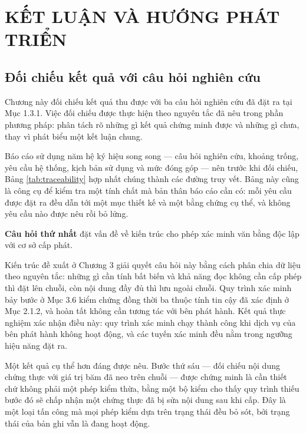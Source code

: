 \chapter{KẾT LUẬN VÀ HƯỚNG PHÁT TRIỂN}

\section{Đối chiếu kết quả với câu hỏi nghiên cứu}

Chương này đối chiếu kết quả thu được với ba câu hỏi nghiên cứu đã đặt ra tại Mục 1.3.1. Việc đối chiếu được thực hiện theo nguyên tắc đã nêu trong phần phương pháp: phân tách rõ những gì kết quả chứng minh được và những gì chưa, thay vì phát biểu một kết luận chung.

Báo cáo sử dụng năm hệ ký hiệu song song --- câu hỏi nghiên cứu, khoảng trống, yêu cầu hệ thống, kịch bản sử dụng và mức đóng góp --- nên trước khi đối chiếu, Bảng \ref{tab:traceability} hợp nhất chúng thành các đường truy vết. Bảng này cũng là công cụ để kiểm tra một tính chất mà bản thân báo cáo cần có: mỗi yêu cầu được đặt ra đều dẫn tới một mục thiết kế và một bằng chứng cụ thể, và không yêu cầu nào được nêu rồi bỏ lửng.




\noindent \textbf{Câu hỏi thứ nhất} đặt vấn đề về kiến trúc cho phép xác minh văn bằng độc lập với cơ sở cấp phát.

Kiến trúc đề xuất ở Chương 3 giải quyết câu hỏi này bằng cách phân chia dữ liệu theo nguyên tắc: những gì cần tính bất biến và khả năng đọc không cần cấp phép thì đặt lên chuỗi, còn nội dung đầy đủ thì lưu ngoài chuỗi. Quy trình xác minh bảy bước ở Mục 3.6 kiểm chứng đồng thời ba thuộc tính tin cậy đã xác định ở Mục 2.1.2, và hoàn tất không cần tương tác với bên phát hành. Kết quả thực nghiệm xác nhận điều này: quy trình xác minh chạy thành công khi dịch vụ của bên phát hành không hoạt động, và các tuyến xác minh đều nằm trong ngưỡng hiệu năng đặt ra.

Một kết quả cụ thể hơn đáng được nêu. Bước thứ sáu --- đối chiếu nội dung chứng thực với giá trị băm đã neo trên chuỗi --- được chứng minh là cần thiết chứ không phải một phép kiểm thừa, bằng một bộ kiểm cho thấy quy trình thiếu bước đó sẽ chấp nhận một chứng thực đã bị sửa nội dung sau khi cấp. Đây là một loại tấn công mà mọi phép kiểm dựa trên trạng thái đều bỏ sót, bởi trạng thái của bản ghi vẫn là đang hoạt động.

